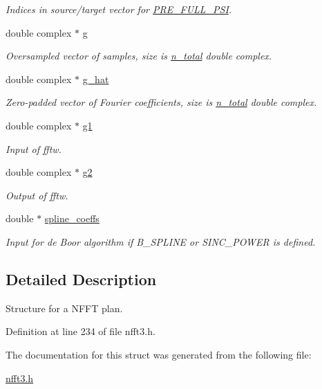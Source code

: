 \begin{CompactItemize}
\begin{CompactList}\small\item\em Indices in source/target vector for \hyperlink{group__nfft_ga21}{PRE\_\-FULL\_\-PSI}. \item\end{CompactList}\item 
\hypertarget{structnfft__plan_o22}{
double complex $\ast$ \hyperlink{structnfft__plan_o22}{g}}
\label{structnfft__plan_o22}

\begin{CompactList}\small\item\em Oversampled vector of samples, size is \hyperlink{structnfft__plan_o8}{n\_\-total} double complex. \item\end{CompactList}\item 
\hypertarget{structnfft__plan_o23}{
double complex $\ast$ \hyperlink{structnfft__plan_o23}{g\_\-hat}}
\label{structnfft__plan_o23}

\begin{CompactList}\small\item\em Zero-padded vector of Fourier coefficients, size is \hyperlink{structnfft__plan_o8}{n\_\-total} double complex. \item\end{CompactList}\item 
\hypertarget{structnfft__plan_o24}{
double complex $\ast$ \hyperlink{structnfft__plan_o24}{g1}}
\label{structnfft__plan_o24}

\begin{CompactList}\small\item\em Input of fftw. \item\end{CompactList}\item 
\hypertarget{structnfft__plan_o25}{
double complex $\ast$ \hyperlink{structnfft__plan_o25}{g2}}
\label{structnfft__plan_o25}

\begin{CompactList}\small\item\em Output of fftw. \item\end{CompactList}\item 
\hypertarget{structnfft__plan_o26}{
double $\ast$ \hyperlink{structnfft__plan_o26}{spline\_\-coeffs}}
\label{structnfft__plan_o26}

\begin{CompactList}\small\item\em Input for de Boor algorithm if B\_\-SPLINE or SINC\_\-POWER is defined. \item\end{CompactList}\end{CompactItemize}


\subsection{Detailed Description}
Structure for a NFFT plan. 



Definition at line 234 of file nfft3.h.

The documentation for this struct was generated from the following file:\begin{CompactItemize}
\item 
\hyperlink{nfft3_8h}{nfft3.h}\end{CompactItemize}
